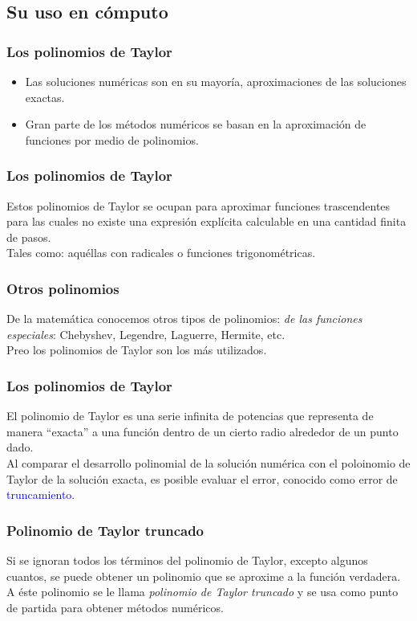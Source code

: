 \documentclass[12pt]{beamer}
\begin{document}
\subsection{Su uso en cómputo}


\begin{frame}
\frametitle{Los polinomios de Taylor}
\begin{itemize}[<+->]
\item[\ding{212}] Las soluciones numéricas son en su mayoría, aproximaciones de las soluciones exactas.
\item[\ding{212}] Gran parte de los métodos numéricos se basan en la aproximación de funciones por medio de polinomios.
\end{itemize}
\end{frame}
\begin{frame}
\frametitle{Los polinomios de Taylor}
Estos polinomios de Taylor se ocupan para aproximar funciones trascendentes para las cuales no existe una expresión explícita calculable en una cantidad finita de pasos.
\\
\bigskip
\pause
Tales como: \pause aquéllas con radicales o funciones trigonométricas.
\end{frame}
\begin{frame}
\frametitle{Otros polinomios}
De la matemática conocemos otros tipos de polinomios: \pause \textit{de las funciones especiales}: Chebyshev, Legendre, Laguerre, Hermite, etc.
\\
\bigskip
\pause
Preo los polinomios de Taylor son los más utilizados.
\end{frame}
\begin{frame}
\frametitle{Los polinomios de Taylor}
El polinomio de Taylor es una serie infinita de potencias que representa de manera \enquote{exacta} a una función dentro de un cierto radio alrededor de un punto dado.
\\
\bigskip
\pause
Al comparar el desarrollo polinomial de la solución numérica con el poloinomio de Taylor de la solución exacta, \pause es posible evaluar el error, conocido como error de \textcolor{blue}{truncamiento}.
\end{frame}
\begin{frame}
\frametitle{Polinomio de Taylor truncado}
Si se ignoran todos los términos del polinomio de Taylor, excepto algunos cuantos, se puede obtener un polinomio que se aproxime a la función verdadera.
\\
\bigskip
\pause
A éste polinomio se le llama \textit{polinomio de Taylor truncado} y se usa como punto de partida para obtener métodos numéricos.
\end{frame}
\end{document}
